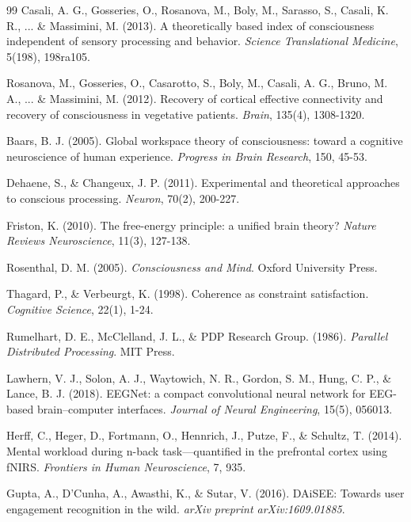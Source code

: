 \documentclass[10pt,journal,compsoc]{IEEEtran}
\begin{document}
\begin{thebibliography}{99}
Casali, A. G., Gosseries, O., Rosanova, M., Boly, M., Sarasso, S., Casali, K. R., ... \& Massimini, M. (2013). A theoretically based index of consciousness independent of sensory processing and behavior. \textit{Science Translational Medicine}, 5(198), 198ra105.

Rosanova, M., Gosseries, O., Casarotto, S., Boly, M., Casali, A. G., Bruno, M. A., ... \& Massimini, M. (2012). Recovery of cortical effective connectivity and recovery of consciousness in vegetative patients. \textit{Brain}, 135(4), 1308-1320.

Baars, B. J. (2005). Global workspace theory of consciousness: toward a cognitive neuroscience of human experience. \textit{Progress in Brain Research}, 150, 45-53.

Dehaene, S., \& Changeux, J. P. (2011). Experimental and theoretical approaches to conscious processing. \textit{Neuron}, 70(2), 200-227.

Friston, K. (2010). The free-energy principle: a unified brain theory? \textit{Nature Reviews Neuroscience}, 11(3), 127-138.

Rosenthal, D. M. (2005). \textit{Consciousness and Mind}. Oxford University Press.

Thagard, P., \& Verbeurgt, K. (1998). Coherence as constraint satisfaction. \textit{Cognitive Science}, 22(1), 1-24.

Rumelhart, D. E., McClelland, J. L., \& PDP Research Group. (1986). \textit{Parallel Distributed Processing}. MIT Press.

Lawhern, V. J., Solon, A. J., Waytowich, N. R., Gordon, S. M., Hung, C. P., \& Lance, B. J. (2018). EEGNet: a compact convolutional neural network for EEG-based brain–computer interfaces. \textit{Journal of Neural Engineering}, 15(5), 056013.

Herff, C., Heger, D., Fortmann, O., Hennrich, J., Putze, F., \& Schultz, T. (2014). Mental workload during n-back task—quantified in the prefrontal cortex using fNIRS. \textit{Frontiers in Human Neuroscience}, 7, 935.

Gupta, A., D'Cunha, A., Awasthi, K., \& Sutar, V. (2016). DAiSEE: Towards user engagement recognition in the wild. \textit{arXiv preprint arXiv:1609.01885}.


\end{thebibliography}
\end{document}
